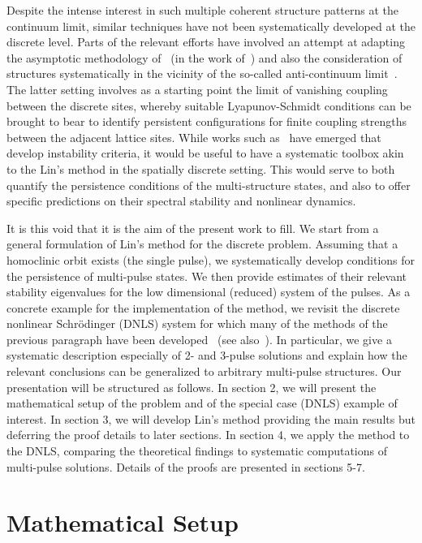 \documentclass[12pt]{article}
\begin{document}
Despite the intense interest in such multiple coherent
structure patterns at the continuum limit, similar 
techniques have not been systematically developed
at the discrete level. Parts of the relevant efforts
have involved an attempt at adapting the
asymptotic methodology of~\cite{elphick} 
(in the work of~\cite{kevold}) and also the consideration
of structures systematically in the vicinity of the
so-called anti-continuum limit~\cite{Pelinovsky2005}.
The latter setting involves as a starting point the
limit of vanishing coupling between the discrete sites,
whereby suitable Lyapunov-Schmidt conditions can 
be brought to bear to identify persistent configurations
for finite coupling strengths between the adjacent
lattice sites. While works such as~\cite{Kapitula2001a}
have emerged that develop instability criteria, it would
be useful to have a systematic toolbox akin to the Lin's
method in the spatially discrete setting. This would
serve to both quantify the persistence conditions of
the multi-structure states, and also to offer specific
predictions on their spectral stability and nonlinear
dynamics.

It is this void that it is the aim of the present work
to fill. We start from a general formulation of Lin's method
for the discrete problem. Assuming that a homoclinic orbit exists (the single pulse), we systematically develop conditions
for the persistence of multi-pulse states. We then provide
estimates of their relevant stability eigenvalues for the
low dimensional (reduced) system of the pulses. As a concrete
example for the implementation of the method, we revisit the
discrete nonlinear Schr{\"o}dinger (DNLS) system for which many of the methods of the previous paragraph have been developed~\cite{Kevrekidis2009} (see also~\cite{pelinovsky_2011}). In particular, we give a 
systematic description especially of 2- and 3-pulse solutions and explain how the relevant conclusions can be generalized
to arbitrary multi-pulse structures. 
Our presentation will be structured as follows.
In section 2, we will present the mathematical
setup of the problem and of the special case (DNLS)
example of interest. In section 3, we will develop
Lin's method providing the main results but deferring
the proof details to later sections. In section 4,
we apply the method to the DNLS, comparing the theoretical
findings to systematic computations of multi-pulse solutions.
Details of the proofs are presented in sections 5-7.

\section{Mathematical Setup}
\end{document}
